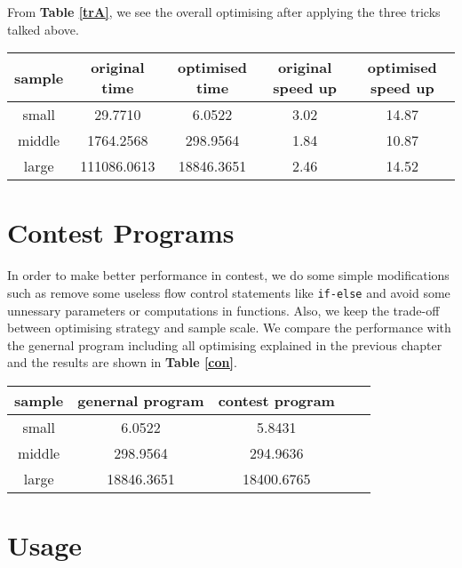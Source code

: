 \documentclass[11pt, a4paper]{article}
\makeatletter
\newcommand\tcaption{\def\@captype{table}\caption}
\newcommand{\tref}[1]{\textbf{Table \ref{#1}}}
\makeatother
\begin{document}
From \tref{trA}, we see the overall optimising after applying the three tricks talked above.

\begin{center}
    \tcaption{Time cost of both passes after optimising}\label{trA}
    \begin{tabular}{ccccc}
        \toprule
        sample & original time & optimised time & original speed up & optimised speed up \\
        \midrule
        small & 29.7710 & 6.0522 & 3.02 & 14.87 \\
        middle & 1764.2568 & 298.9564 & 1.84 & 10.87 \\
        large & 111086.0613 & 18846.3651 & 2.46 & 14.52 \\
        \bottomrule
    \end{tabular}
\end{center}

\section{Contest Programs}

In order to make better performance in contest, we do some simple modifications such as remove some useless flow control statements like \texttt{if-else} and avoid some unnessary parameters or computations in functions. Also, we keep the trade-off between optimising strategy and sample scale. We compare the performance with the genernal program including all optimising explained in the previous chapter and the results are shown in \tref{con}.

\begin{center}
    \tcaption{Performance compare between genernal and contest programs}\label{con}
    \begin{tabular}{ccccc}
        \toprule
        sample & genernal program & contest program \\
        \midrule
        small & 6.0522 & 5.8431 \\
        middle & 298.9564 & 294.9636 \\
        large & 18846.3651 & 18400.6765 \\
        \bottomrule
    \end{tabular}
\end{center}

\section{Usage}
\end{document}
